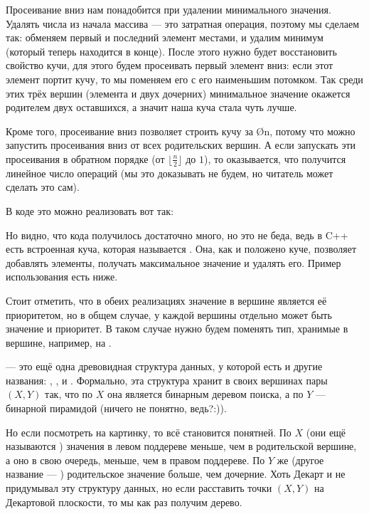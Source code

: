 Просеивание вниз нам понадобится при удалении минимального значения. Удалять числа из начала массива — это затратная операция, поэтому мы сделаем так: обменяем первый и последний элемент местами, и удалим минимум (который теперь находится в конце). После этого нужно будет восстановить свойство кучи, для этого будем просеивать первый элемент вниз: если этот элемент портит кучу, то мы поменяем его с его наименьшим потомком. Так среди этих трёх вершин (элемента и двух дочерних) минимальное значение окажется родителем двух оставшихся, а значит наша куча стала чуть лучше.

Кроме того, просеивание вниз позволяет строить кучу за \O{n}, потому что можно запустить просеивания вниз от всех родительских вершин. А если запускать эти просеивания в обратном порядке (от $\lfloor\frac{n}{2}\rfloor$ до $1$), то оказывается, что получится линейное число операций (мы это доказывать не будем, но читатель может сделать это сам).

В коде это можно реализовать вот так:

\nocode

Но видно, что кода получилось достаточно много, но это не беда, ведь в C++ есть встроенная куча, которая называется . Она, как и положено куче, позволяет добавлять элементы, получать максимальное значение и удалять его. Пример использования  есть ниже.

\nocode

Стоит отметить, что в обеих реализациях значение в вершине является её приоритетом, но в общем случае, у каждой вершины отдельно может быть значение и приоритет. В таком случае нужно будем поменять тип, хранимые в вершине, например, на .


 — это ещё одна древовидная структура данных, у которой есть и другие названия: , ,  и . Формально, эта структура хранит в своих вершинах пары $(X, Y)$ так, что по $X$ она является бинарным деревом поиска, а по $Y$ — бинарной пирамидой (ничего не понятно, ведь?:)).

Но если посмотреть на картинку, то всё становится понятней. По $X$ (они ещё называются ) значения в левом поддереве меньше, чем в родительской вершине, а оно в свою очередь, меньше, чем в правом поддереве. По $Y$ же (другое название — ) родительское значение больше, чем дочерние. Хоть Декарт и не придумывал эту структуру данных, но если расставить точки $(X, Y)$ на Декартовой плоскости, то мы как раз получим дерево.

